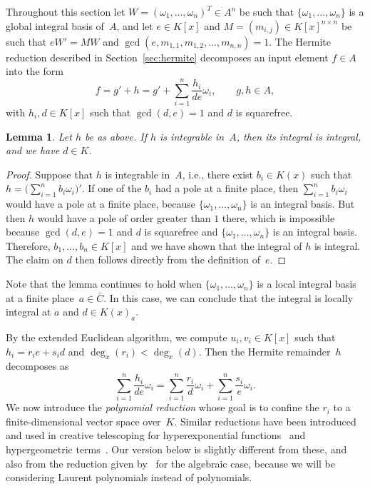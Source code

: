 \documentclass[final,1p,times,authoryear]{elsarticle}
\newtheorem{lemma}[theorem]{Lemma}
\begin{document}
Throughout this section let $W=(\omega_1,\ldots,\omega_n)^T\in A^n$ be such
that $\{\omega_1, \ldots, \omega_n\}$ is a global integral basis of~$A$, and
let $e\in K[x]$ and $M=(m_{i,j})\in K[x]^{n\times n}$ be such that $eW'=MW$
and $\gcd(e, m_{1, 1}, m_{1, 2}, \ldots, m_{n ,n})=1$. The Hermite reduction
described in Section~\ref{sec:hermite} decomposes an input element $f\in A$
into the form
\[
  f = g' + h = g' + \sum_{i=1}^n \frac{h_i}{de} \omega_i,\qquad
  g, h\in A,
\]
with $h_i, d\in K[x]$ such that $\gcd(d, e)=1$ and $d$ is squarefree.
\begin{lemma}\label{LEM:d}
  Let $h$ be as above. If $h$ is integrable in~$A$,
  then its integral is integral, and we have $d\in K$.
\end{lemma}
\begin{proof}
  Suppose that $h$ is integrable in~$A$, i.e., there exist $b_i\in K(x)$
  such that $h = \bigl(\sum_{i=1}^n b_i \omega_i\bigr)'$.
  If one of the $b_i$ had a pole at a finite place, then $\sum_{i=1}^n b_i\omega_i$
  would have a pole at a finite place, because $\{\omega_1,\dots,\omega_n\}$ is
  an integral basis. But then $h$ would have a pole of order greater than $1$
  there, which is impossible because $\gcd(d,e)=1$ and $d$ is squarefree and
  $\{\omega_1,\dots,\omega_n\}$ is an integral basis.
  Therefore, $b_1,\dots,b_n\in K[x]$ and we have shown that the integral of $h$
  is integral. The claim on $d$ then follows directly from the definition of~$e$.
\end{proof}

Note that the lemma continues to hold when $\{\omega_1,\dots,\omega_n\}$ is
a local integral basis at a finite place~$a\in\bar C$. In this case, we can conclude
that the integral is locally integral at $a$ and $d\in K(x)_a$. 

By the extended Euclidean algorithm, we compute $u_i, v_i\in K[x]$ such that
$h_i = r_i e + s_i d$ and $\deg_x(r_i) < \deg_x(d)$. Then the Hermite remainder~$h$
decomposes as
\begin{equation}\label{EQ:h}
  \sum_{i=1}^n \frac{h_i}{de}\omega_i =
  \sum_{i=1}^n \frac{r_i}{d}\omega_i +
  \sum_{i=1}^n \frac{s_i}{e}\omega_i.
\end{equation}
We now introduce the \emph{polynomial reduction} whose goal is to confine the $r_i$ to a finite-dimensional
vector space over~$K$. Similar reductions have been introduced and used in creative telescoping
for hyperexponential functions~\citep{bostan13a} and hypergeometric terms~\citep{chen15a}.
Our version below is slightly different from these, and also from the reduction given by~\cite{chen16} for
the algebraic case, because we will be considering Laurent polynomials instead of polynomials.
\end{document}
